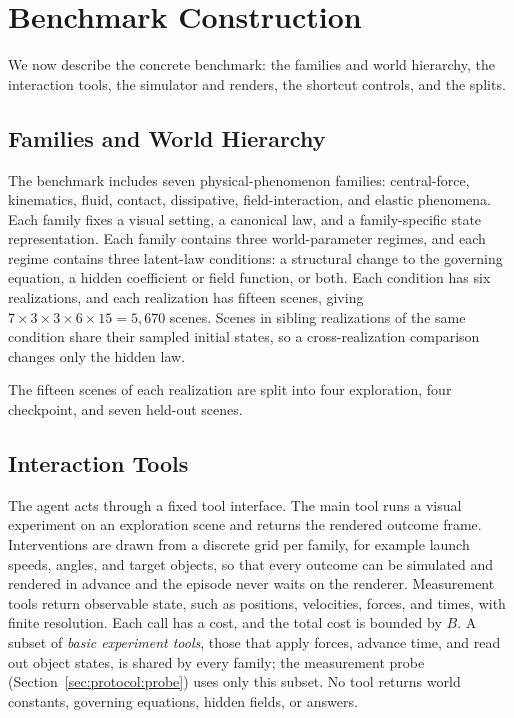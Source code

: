 \section{Benchmark Construction}
\label{sec:construction}

We now describe the concrete benchmark: the families and world hierarchy, the interaction tools, the simulator and renders, the shortcut controls, and the splits.

\subsection{Families and World Hierarchy}

The benchmark includes seven physical-phenomenon families: central-force, kinematics, fluid, contact, dissipative, field-interaction, and elastic phenomena. Each family fixes a visual setting, a canonical law, and a family-specific state representation. Each family contains three world-parameter regimes, and each regime contains three latent-law conditions: a structural change to the governing equation, a hidden coefficient or field function, or both. Each condition has six realizations, and each realization has fifteen scenes, giving $7 \times 3 \times 3 \times 6 \times 15 = 5{,}670$ scenes. Scenes in sibling realizations of the same condition share their sampled initial states, so a cross-realization comparison changes only the hidden law. 

The fifteen scenes of each realization are split into four exploration, four checkpoint, and seven held-out scenes. 

\subsection{Interaction Tools}
\label{sec:construction:tools}

The agent acts through a fixed tool interface. The main tool runs a visual experiment on an exploration scene and returns the rendered outcome frame. Interventions are drawn from a discrete grid per family, for example launch speeds, angles, and target objects, so that every outcome can be simulated and rendered in advance and the episode never waits on the renderer. Measurement tools return observable state, such as positions, velocities, forces, and times, with finite resolution. Each call has a cost, and the total cost is bounded by $B$. A subset of \emph{basic experiment tools}, those that apply forces, advance time, and read out object states, is shared by every family; the measurement probe (Section~\ref{sec:protocol:probe}) uses only this subset. No tool returns world constants, governing equations, hidden fields, or answers.

